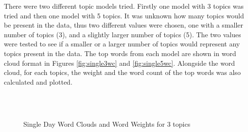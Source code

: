 There were two different topic models tried. Firstly one model with 3 topics was tried and then one model with 5 topics. It was unknown how many topics would be present in the data, thus two different values were chosen, one with a smaller number of topics (3), and a slightly larger number of topics (5). The two values were tested to see if a smaller or a larger number of topics would represent any topics present in the data. The top words from each model are shown in word cloud format in Figures \ref{fig:single3wc} and \ref{fig:single5wc}. Alongside the word cloud, for each topics, the weight and the word count of the top words was also calculated and plotted. 
	
\begin{figure}[H]
	\centering
	\\
	\\
	
	\caption{Single Day Word Clouds and Word Weights for 3 topics}
	\label{fig:single3}
\end{figure}

